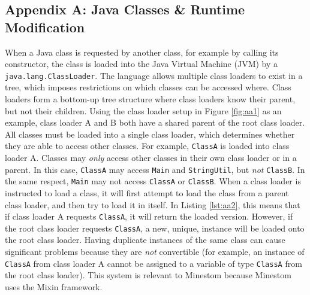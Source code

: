 \documentclass[12pt]{article}
\def\code#1{\texttt{#1}}
\begin{document}
\newpage
{} %
\printbibliography

\begin{onehalfspacing}

\newpage
{}
\section*{Appendix A: Java Classes \& Runtime Modification}

When a Java class is requested by another class, for example by calling
its constructor, the class is loaded into the Java Virtual Machine (JVM)
by a \code{java.lang.ClassLoader}. The language allows multiple class loaders
to exist in a tree, which imposes restrictions on which classes can be
accessed where. Class loaders form a bottom-up tree structure where
class loaders know their parent, but not their children. Using the class
loader setup in Figure \ref{fig:aa1} as an example, class loader A and B both
have a shared parent of the root class loader. All classes must be
loaded into a single class loader, which determines whether they are
able to access other classes. For example, \code{ClassA} is loaded into class
loader A. Classes may \emph{only} access other classes in their own class
loader or in a parent. In this case, \code{ClassA} may access \code{Main} and
\code{StringUtil}, but \emph{not} \code{ClassB}. In the same respect, \code{Main} may 
not access \code{ClassA} or \code{ClassB}. When a class loader is instructed to 
load a class, it will first attempt to load the class from a parent class
loader, and then try to load it in itself. In Listing \ref{lst:aa2}, this means
that if class loader A requests \code{ClassA}, it will return the loaded
version. However, if the root class loader requests \code{ClassA}, a new,
unique, instance will be loaded onto the root class loader. Having
duplicate instances of the same class can cause significant problems
because they are \emph{not} convertible (for example, an instance of
\code{ClassA} from class loader A cannot be assigned to a variable of type
\code{ClassA} from the root class loader). This system is relevant to
Minestom because Minestom uses the Mixin framework.


\end{onehalfspacing}
\end{document}
